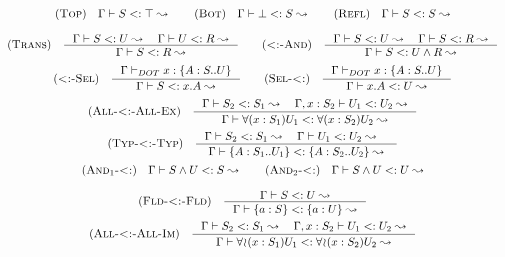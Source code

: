 \[\begin{array}{c}
    \RULE{Top} \quad \SJ{\Gamma}{S}{\top} \qquad

    \RULE{Bot} \quad \SJ{\Gamma}{\bot}{S} \qquad

    \RULE{Refl} \quad \SJ{\Gamma}{S}{S} \\[4mm]

    \RULE{Trans} \quad \inference{
        \SJ{\Gamma}{S}{U} \quad
        \SJ{\Gamma}{U}{R}
    }{
        \SJ{\Gamma}{S}{R}
    } \qquad

    \RULE{<:-And} \quad \inference{
        \SJ{\Gamma}{S}{U} \quad
        \SJ{\Gamma}{S}{R}
    }{
        \SJ{\Gamma}{S}{\AGG{U}{R}}
    } \\[4mm]

    \RULE{<:-Sel} \quad \inference{
        \TJT{\Gamma}{x}{\TDEC{A}{S}{U}}
    }{
        \SJ{\Gamma}{S}{x.A}
    } \qquad

    \RULE{Sel-<:} \quad \inference{
        \TJT{\Gamma}{x}{\TDEC{A}{S}{U}}
    }{
        \SJ{\Gamma}{x.A}{U}
    } \\[4mm]

    \RULE{All-<:-All-Ex} \quad \inference{
        \SJ{\Gamma}{S_2}{S_1} \quad
        \SJ{\Gamma, x: S_2}{U_1}{U_2}
    }{
        \SJ{\Gamma}{\DFUN{x}{S_1}{U_1}}{\DFUN{x}{S_2}{U_2}}
    } \\[4mm]

    \RULE{Typ-<:-Typ} \quad \inference{
        \SJ{\Gamma}{S_2}{S_1} \quad
        \SJ{\Gamma}{U_1}{U_2} \quad
    }{
        \SJ{\Gamma}{\TDEC{A}{S_1}{U_1}}{\TDEC{A}{S_2}{U_2}}
    } \\[4mm]

    \RULE{And$_1$-<:} \quad \SJ{\Gamma}{\AGG{S}{U}}{S} \qquad

    \RULE{And$_2$-<:} \quad \SJ{\Gamma}{\AGG{S}{U}}{U} \\[4mm]

    \RULE{Fld-<:-Fld} \quad \inference{
        \SJ{\Gamma}{S}{U}
    }{
        \SJ{\Gamma}{\FDEC{a}{S}}{\FDEC{a}{U}}
    } \\[4mm]

    \RULE{All-<:-All-Im} \quad \inference{
        \SJ{\Gamma}{S_2}{S_1} \quad
        \SJ{\Gamma, x: S_2}{U_1}{U_2}
    }{
        \SJ{\Gamma}{\IFUN{x}{S_1}{U_1}}{\IFUN{x}{S_2}{U_2}}
    }
\end{array}\]
